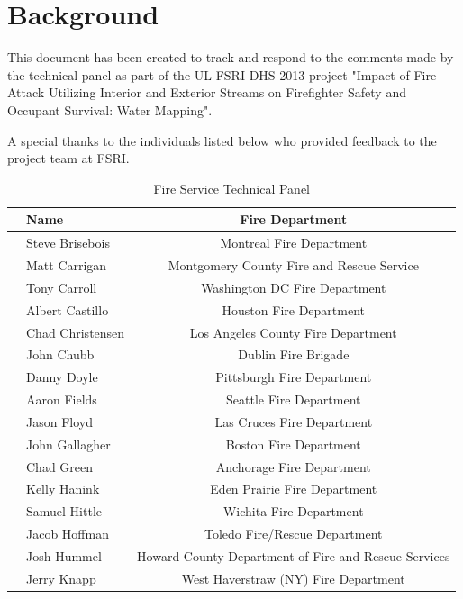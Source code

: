 \documentclass[12pt,oneside]{book}
\begin{document}
\mainmatter

\chapter*{Background}
\label{background}

This document has been created to track and respond to the comments made by the technical panel as part of the UL FSRI DHS 2013 project "Impact of Fire Attack Utilizing Interior and Exterior Streams on Firefighter Safety and Occupant Survival: Water Mapping". 

A special thanks to the individuals listed below who provided feedback to the project team at FSRI. 

\begin{table}[!ht]
	\centering
	\caption*{Fire Service Technical Panel}
	\begin{tabular}{llc}
		\toprule[1.5pt]
		& Name & Fire Department \\ 
		\midrule
		& Steve Brisebois  & Montreal Fire Department \\ 
		& Matt Carrigan    & Montgomery County Fire and Rescue Service \\ 
		& Tony Carroll     & Washington DC Fire Department \\ 
		& Albert Castillo  & Houston Fire Department \\ 
		\checkmark & Chad Christensen & Los Angeles County Fire Department \\ 
		& John Chubb       & Dublin Fire Brigade \\ 		 		  
		& Danny Doyle      & Pittsburgh Fire Department \\ 
		& Aaron Fields     & Seattle Fire Department \\ 
		\checkmark & Jason Floyd      & Las Cruces Fire Department \\ 
		& John Gallagher   & Boston Fire Department \\ 
		& Chad Green       & Anchorage Fire Department \\ 
		\checkmark & Kelly Hanink     & Eden Prairie Fire Department \\ 
		& Samuel Hittle    & Wichita Fire Department \\ 
		& Jacob Hoffman    & Toledo Fire/Rescue Department \\ 
		\checkmark & Josh Hummel      & Howard County Department of Fire and Rescue Services \\ 
		\checkmark & Jerry Knapp      & West Haverstraw (NY) Fire Department \\ 

\end{tabular}
\end{table}
\end{document}
